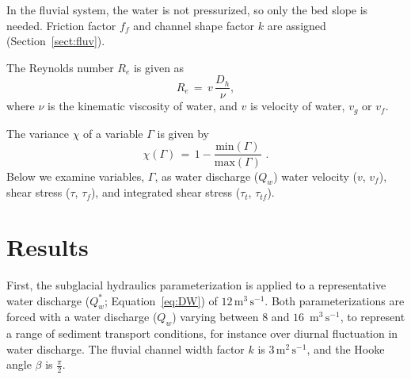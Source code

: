 \documentclass[11pt]{article}
\newcommand{\unit}[1]{$\mathrm{#1}$}
\begin{document}
\begin{spacing}{1}
          In the fluvial system, the water is not pressurized, so only the bed slope is needed. Friction factor $f_f$ and channel shape factor $k$ are assigned (Section~\ref{sect:fluv}).
        
          The Reynolds number $R_e$ is given as 
          \begin{equation}
            \label{eq:re}
            R_e\,=\, v \,\frac{D_h}{\nu},
          \end{equation}
          \noindent where $\nu$ is the kinematic viscosity of water, and  $v$ is velocity of water, $v_g$ or $v_f$.
        
          The variance $ \chi$ of a variable $\Gamma$ is given by 
          \begin{equation}
            \label{eq:var}
            \chi(\Gamma) \,=\, 1 - \frac{\mathrm{min}(\Gamma)}{\mathrm{max}(\Gamma)}\,\,.
          \end{equation}
          \noindent Below we examine variables, $\Gamma$, as water discharge ($Q_w$) water velocity ($v$, $v_f$), shear stress ($\tau$, $\tau_f$), and integrated shear stress ($\tau_t$, $\tau_{tf}$).
        
          
          \section{Results}
          First, the subglacial hydraulics parameterization is applied to a representative water discharge ($Q_w^*$; Equation~\ref{eq:DW}) of $12$\,\unit{m}$^{3}$\,\unit{s}$^{-1}$.
          Both parameterizations are forced with a water discharge ($Q_w$) varying between $8$ and $16$ \,\unit{m}$^{3}$\,\unit{s}$^{-1}$, to represent a range of sediment transport conditions, for instance over diurnal fluctuation in water discharge. The fluvial channel width factor $k$ is $3$\,\unit{m}$^{2}$\,\unit{s}$^{-1}$, and the Hooke angle $\beta$ is $\frac{\pi}{2}$.
          

\end{spacing}
\end{document}
